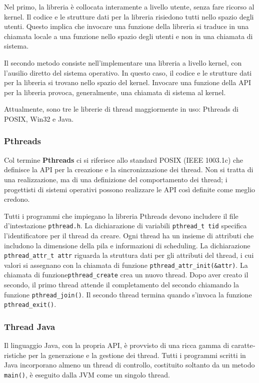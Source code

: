 \documentclass[11pt,a4paper]{article}
\begin{document}
Nel primo, la libreria è collocata interamente a livello utente, senza fare ricorso al kernel. Il co­dice e le strutture dati per la libreria risiedono tutti nello spazio degli utenti. Questo impli­ca che invocare una funzione della libreria si traduce in una chiamata locale a una funzione
nello spazio degli utenti e non in una chiamata di sistema.

Il secondo metodo consiste nell'implementare una libreria a livello kernel, con l'ausi­lio diretto del sistema operativo. In questo caso, il codice e le strutture dati per la libreria si
trovano nello spazio del kernel. Invocare una funzione della API per la libreria provoca, ge­neralmente, una chiamata di sistema al kernel.

Attualmente, sono tre le librerie di thread maggiormente in uso: Pthreads di POSIX,
Win32 e Java.

\subsubsection{Pthreads}
Col termine \textbf{Pthreads} ci si riferisce allo standard POSIX (IEEE 1003.1c) che definisce la API
per la creazione e la sincronizzazione dei thread. Non si tratta di una realizzazione, ma di
una definizione del comportamento dei thread; i progettisti di sistemi operativi possono rea­lizzare le API così definite come meglio credono.

Tutti i programmi che impiegano la libreria Pthreads devono includere il file d'intesta­zione \texttt{pthread.h}. La dichiarazione di variabili \texttt{pthread\_t tid} specifica l'identificatore per
il thread da creare. Ogni thread ha un insieme di attributi che includono la dimensione della
pila e informazioni di scheduling. La dichiarazione \texttt{pthread\_attr\_t attr} riguarda la strut­tura dati per gli attributi del thread, i cui valori si assegnano con la chiamata di funzione \texttt{pthread\_attr\_init(\&attr)}.
La chiamata di funzione\texttt{pthread\_create} crea un
nuovo thread.
Dopo aver creato il secondo, il pri­mo thread attende il completamento del secondo chiamando la funzione \texttt{pthread\_join()}.
Il secondo thread termina quando s'invoca la funzione \texttt{pthread\_exit()}.

\subsubsection{Thread Java}
Il linguaggio Java, con la propria API, è provvisto di una ricca gamma di caratte­ristiche per la generazione e la gestione dei thread. Tutti i programmi scritti in Java incorpo­rano almeno un thread di controllo, costituito soltanto
da un metodo \texttt{main()}, è eseguito dalla JVM come un singolo thread.
\end{document}
